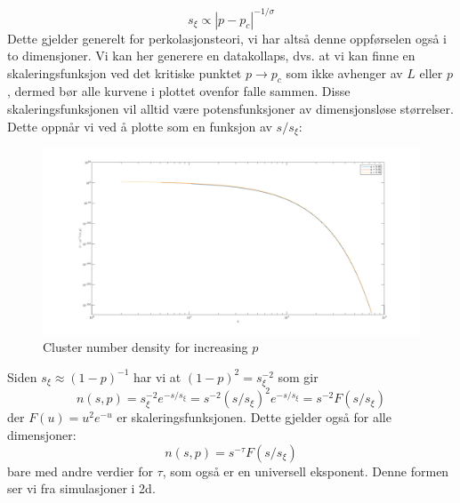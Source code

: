 \documentclass[english, a4paper]{article}
\begin{document}
\begin{equation}
 s_\xi \propto |p - p_c|^{-1/\sigma}
\end{equation}
Dette gjelder generelt for perkolasjonsteori, vi har altså denne oppførselen også i to dimensjoner. 
Vi kan her generere en datakollaps, dvs. at vi kan finne en skaleringsfunksjon ved det kritiske punktet
$p \to p_c$ som ikke avhenger av $L$ eller $p$, dermed bør alle kurvene i plottet ovenfor falle sammen.
Disse skaleringsfunksjonen vil alltid være potensfunksjoner av dimensjonsløse størrelser. 
Dette oppnår vi ved å plotte som en funksjon av $s/s_\xi$:
\begin{figure}[H]
  \begin{center}
  \includegraphics[width = 140mm]{../Figures/cndDataCollapse1d.png}
  \caption{Cluster number density for increasing $p$}
  \label{fig:fig9}
  \end{center}
\end{figure}
Siden $s_\xi \approx (1-p)^{-1}$ har vi at $(1-p)^2 = s_\xi^{-2}$ som gir
\begin{equation}
 n(s,p) = s_\xi^{-2} e^{-s/s_\xi} = s^{-2}(s/s_\xi)^2e^{-s/s_\xi} = s^{-2}F(s/s_\xi)
\end{equation}
der $F(u) = u^2e^{-u}$ er skaleringsfunksjonen. Dette gjelder også for alle dimensjoner:
\begin{equation}
 n(s,p) = s^{-\tau}F(s/s_\xi)
\end{equation}
bare med andre verdier for $\tau$, som også er en universell eksponent. Denne formen ser vi
fra simulasjoner i 2d. 
\end{document}
